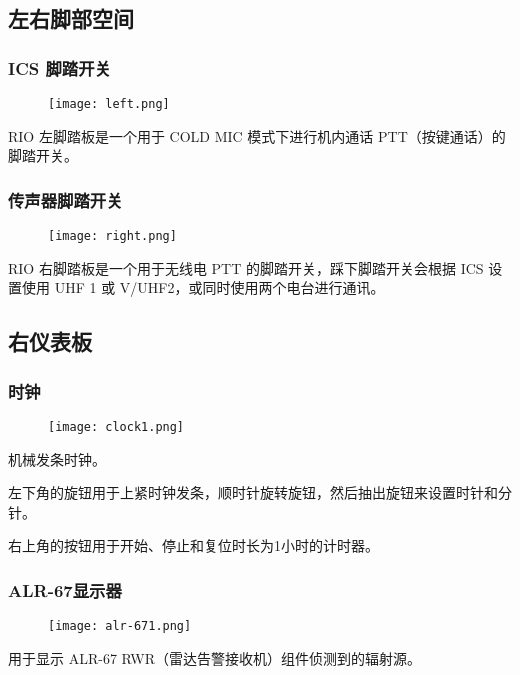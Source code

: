 \subsection{左右脚部空间}

\subsubsection{ICS 脚踏开关}
\begin{figure}[htb]
  \center
  \texttt{[image: left.png]}
\end{figure}
RIO 左脚踏板是一个用于 COLD MIC 模式下进行机内通话 PTT（按键通话）的脚踏开关。

\subsubsection{传声器脚踏开关}
\begin{figure}[htb]
  \center
  \texttt{[image: right.png]}
\end{figure}
RIO 右脚踏板是一个用于无线电 PTT 的脚踏开关，踩下脚踏开关会根据 ICS 设置使用 UHF 1 或 V/UHF2，或同时使用两个电台进行通讯。

\subsection{右仪表板}

\subsubsection{时钟}
\begin{figure}[htb]
  \center
  \texttt{[image: clock1.png]}
\end{figure}
机械发条时钟。

左下角的旋钮用于上紧时钟发条，顺时针旋转旋钮，然后抽出旋钮来设置时针和分针。

右上角的按钮用于开始、停止和复位时长为1小时的计时器。

\subsubsection{ALR-67显示器}
\begin{figure}[htb]
  \center
  \texttt{[image: alr-671.png]}
\end{figure}
用于显示 ALR-67 RWR（雷达告警接收机）组件侦测到的辐射源。

